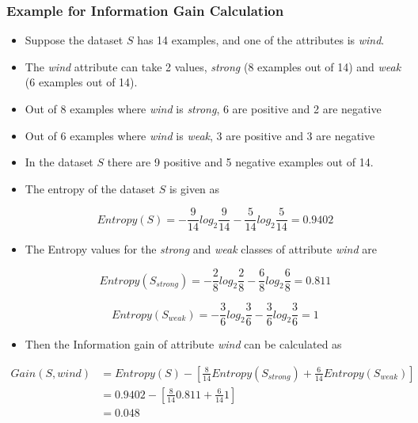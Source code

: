 \documentclass{article}
\theoremstyle{plain}
\theoremstyle{definition}
\begin{document}
\subsubsection{Example for Information Gain Calculation}
\begin{itemize}
    \item Suppose the dataset $S$ has 14 examples, and one of the attributes is \textit{wind}.
    
    \item The \textit{wind} attribute can take 2 values, \textit{strong} (8 examples out of 14) and \textit{weak} (6 examples out of 14). 
    
    \item Out of 8 examples where \textit{wind} is \textit{strong}, 6 are positive and 2 are negative
    
    \item Out of 6 examples where \textit{wind} is \textit{weak}, 3 are positive and 3 are negative
    
    \item In the dataset $S$ there are 9 positive and 5 negative examples out of 14.
    
    \item The entropy of the dataset $S$ is given as
    
    \begin{equation*}
        Entropy(S) = - \frac{9}{14} log_{2} \frac{9}{14} - \frac{5}{14} log_{2} \frac{5}{14} = 0.9402
    \end{equation*}
    
    \item The Entropy values for the \textit{strong} and \textit{weak} classes of attribute \textit{wind} are
    
    \begin{equation*}
        Entropy(S_{strong}) = -\frac{2}{8} log_{2} \frac{2}{8} - \frac{6}{8} log_{2} \frac{6}{8} = 0.811
    \end{equation*}
    
    \begin{equation*}
        Entropy(S_{weak}) = -\frac{3}{6} log_{2} \frac{3}{6} - \frac{3}{6} log_{2} \frac{3}{6} = 1
    \end{equation*}
    
    \item Then the Information gain of attribute \textit{wind} can be calculated as
\end{itemize}
\begin{align*}
        Gain(S, wind) &= Entropy(S) - \left[\frac{8}{14} Entropy(S_{strong}) + \frac{6}{14} Entropy(S_{weak})\right] \\
        &= 0.9402 - \left[\frac{8}{14} 0.811 + \frac{6}{14} 1\right] \\
        &= 0.048
\end{align*}
\end{document}
